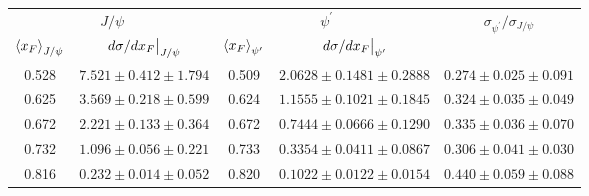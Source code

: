 \begin{tabular}{cc|cc|c}
\hline
\multicolumn{2}{c|}{$J/\psi$} &
  \multicolumn{2}{c|}{$\psi^{\prime}$} &
  \multirow{2}{*}{$\sigma_{\psi^\prime}/\sigma_{J/\psi}$} \\ \cline{1-4}
$\expval{x_F}_{J/\psi}$ &
  $\eval{d\sigma/dx_F}_{J/\psi}$ &
  $\expval{x_F}_{\psi^\prime}$ &
  $\eval{d\sigma/dx_F}_{\psi^\prime}$ &
   \\ \hline
\multicolumn{1}{c|}{0.528} &
  $7.521\pm0.412\pm1.794$ &
  \multicolumn{1}{c|}{0.509} &
  $2.0628\pm0.1481\pm0.2888$ &
  $0.274\pm0.025\pm0.091$ \\
\multicolumn{1}{c|}{0.625} &
  $3.569\pm0.218\pm0.599$ &
  \multicolumn{1}{c|}{0.624} &
  $1.1555\pm0.1021\pm0.1845$ &
  $0.324\pm0.035\pm0.049$ \\
\multicolumn{1}{c|}{0.672} &
  $2.221\pm0.133\pm0.364$ &
  \multicolumn{1}{c|}{0.672} &
  $0.7444\pm0.0666\pm0.1290$ &
  $0.335\pm0.036\pm0.070$ \\
\multicolumn{1}{c|}{0.732} &
  $1.096\pm0.056\pm0.221$ &
  \multicolumn{1}{c|}{0.733} &
  $0.3354\pm0.0411\pm0.0867$ &
  $0.306\pm0.041\pm0.030$ \\
\multicolumn{1}{c|}{0.816} &
  $0.232\pm0.014\pm0.052$ &
  \multicolumn{1}{c|}{0.820} &
  $0.1022\pm0.0122\pm0.0154$ &
  $0.440\pm0.059\pm0.088$ \\ \hline
\end{tabular}
